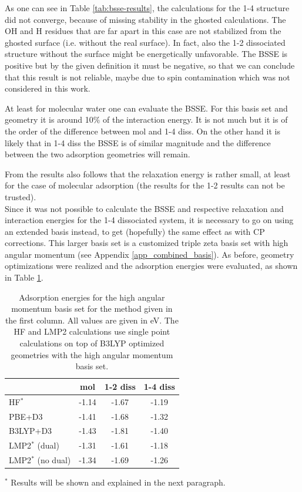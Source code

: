 \documentclass[11pt,DIV=13,BCOR=5mm,a4paper,headinclude]{scrbook}
\begin{document}
As one can see in Table \ref{tab:bsse-results}, the calculations for the 1-4 structure did not converge, because of missing stability in the ghosted calculations.
The OH and H residues that are far apart in this case are not stabilized from the ghosted surface (i.e. without the real surface).
In fact, also the 1-2 dissociated structure without the surface might be energetically unfavorable.
The BSSE is positive but by the given definition it must be negative, so that we can conclude that this result is not reliable, maybe due to spin contamination which was not considered in this work.


At least for molecular water one can evaluate the BSSE.
For this basis set and geometry it is around 10$\%$ of the interaction
energy.
It is not much but it is of the order of the difference between mol and 1-4 diss.
On the other hand it is likely that in 1-4 diss the BSSE is of similar magnitude and the difference between the two adsorption geometries will remain.


From the results also follows that the relaxation energy is rather small, at least for the case of molecular adsorption (the results for the 1-2 results can not be trusted).
\\

Since it was not possible to calculate the BSSE and respective relaxation and interaction energies for the 1-4 dissociated system, it is necessary to go on using an extended basis instead, to get (hopefully) the same effect as with CP corrections.
This larger basis set is a customized triple zeta basis set with high angular momentum (see Appendix \ref{app_combined_basis}).
As before, geometry optimizations were realized and the adsorption energies were evaluated, as shown in Table \ref{tab:combined_results}.
\begin{table}[!h]
  \centering
   \caption{Adsorption energies for the high angular momentum basis set for the method given in the first column.
All values are given in eV. The HF and LMP2 calculations use single point calculations on top of B3LYP optimized geometries with the high angular momentum basis set.}
  \begin{tabular}{l|ccc}
  \toprule
   &mol & 1-2 diss & 1-4 diss \\\midrule
HF$^\ast$ &-1.14 & -1.67 & -1.19\\
PBE+D3 & -1.41 & -1.68 & -1.32 \\
B3LYP+D3 & -1.43 & -1.81 & -1.40 \\
LMP2$^\ast$ (dual) & -1.31 & -1.61 & -1.18 \\ %
LMP2$^\ast$ (no dual) & -1.34 & -1.69 & -1.26\\\bottomrule
  \end{tabular}
  \begin{tablenotes}
 \footnotesize
\item[] $^\ast$ Results will be shown and explained in the next paragraph.
  \end{tablenotes}
  \label{tab:combined_results}
\end{table}
\\
\end{document}
